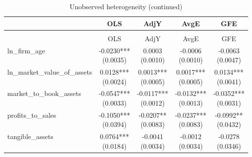 \documentclass{article}
\begin{document}
\begin{longtable}{@{\extracolsep{\fill}}lcccc}
    \caption{Unobserved heterogeneity}                                              \\
    \toprule
                                  & OLS                  & AdjY   & AvgE   & GFE    \\
    \midrule
    \endfirsthead
    \caption[]{Unobserved heterogeneity (continued)}                                \\
    \toprule
                                  & OLS                  & AdjY   & AvgE   & GFE    \\
    \midrule
    \endhead
    \midrule
    \endfoot
    \bottomrule
    \endlastfoot
    ln\_firm\_age                 & \makecell{-0.0230***                            \\(0.0035)} & \makecell{0.0003 \\(0.0010)} & \makecell{-0.0006 \\(0.0010)} & \makecell{-0.0063 \\(0.0047)} \\
    ln\_market\_value\_of\_assets & \makecell{0.0128***                             \\(0.0024)} & \makecell{0.0013*** \\(0.0005)} & \makecell{0.0017*** \\(0.0005)} & \makecell{0.0134*** \\(0.0041)} \\
    market\_to\_book\_assets      & \makecell{-0.0547***                            \\(0.0033)} & \makecell{-0.0117*** \\(0.0012)} & \makecell{-0.0132*** \\(0.0013)} & \makecell{-0.0352*** \\(0.0031)} \\
    profits\_to\_sales            & \makecell{-0.1050***                            \\(0.0394)} & \makecell{-0.0207**  \\(0.0083)} & \makecell{-0.0237*** \\(0.0083)} & \makecell{-0.0992**  \\(0.0432)} \\
    tangible\_assets              & \makecell{0.0764***                             \\(0.0184)} & \makecell{-0.0041   \\(0.0034)} & \makecell{-0.0012   \\(0.0034)} & \makecell{-0.0278   \\(0.0346)} \\

\end{longtable}
\end{document}
